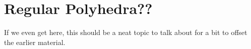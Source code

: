 \section{Regular Polyhedra??}

If we even get here, this should be a neat topic to talk about
for a bit to offset the earlier material.

